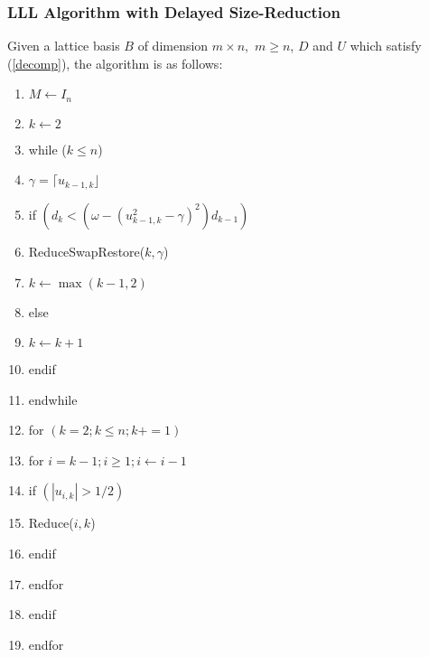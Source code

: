 \documentclass{beamer}
\begin{document}
\begin{frame}
\frametitle{LLL Algorithm with Delayed Size-Reduction}
Given a lattice basis $B$ of dimension $m\times n,$ $m\geq n$, $D$ and $U$ which satisfy (\ref{decomp}), the algorithm is as follows\cite{LuoQiaoParallelLLL}:
\begin{tiny}
\begin{enumerate}[1]
\item $M\leftarrow I_n$
\item $k\leftarrow 2$
\item while ($k\leq n$)
\item \hspace{2em} $\gamma=\lceil u_{k-1,k} \rfloor $
\item \hspace{2em} if $\left(d_k<(\omega -(u^2_{k-1,k}-\gamma)^2)d_{k-1}\right)$
\item \hspace{2em}\hspace{2em} ReduceSwapRestore($k,\gamma$)
\item \hspace{2em}\hspace{2em} $k\leftarrow\max(k-1,2)$
\item \hspace{2em} else
\item \hspace{2em}\hspace{2em} $k\leftarrow k+1$
\item \hspace{2em} endif
\item endwhile
\item for $\left(k=2; k\leq n; k+=1\right)$
\item \hspace{2em}\hspace{2em} for $i=k-1; i \geq 1; i\leftarrow i-1$
\item \hspace{2em}\hspace{2em} \hspace{2em} if $\left(|u_{i,k}|>1/2\right)$
\item \hspace{2em}\hspace{2em} \hspace{2em} \hspace{2em} Reduce($i,k$)
\item \hspace{2em}\hspace{2em} \hspace{2em} endif
\item \hspace{2em}\hspace{2em} endfor
\item \hspace{2em} endif
\item endfor
\end{enumerate}
\end{tiny}
\end{frame}
\end{document}
